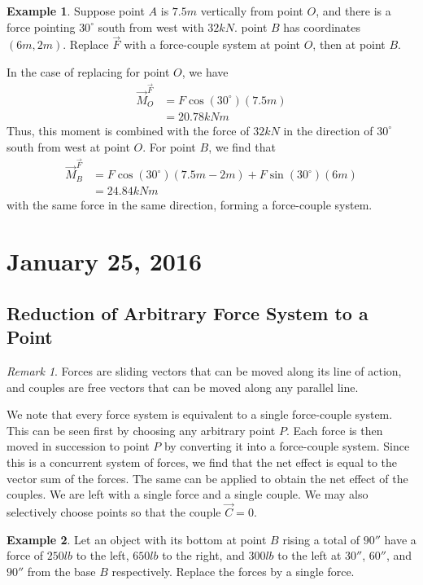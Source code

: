 \documentclass[11pt]{article}
\theoremstyle{plain} %
\theoremstyle{definition}
\theoremstyle{example}
\newtheorem*{example}{Example}
\theoremstyle{remark}
\newtheorem*{remark}{Remark}
\begin{document}
\begin{example}
Suppose point $A$ is $7.5m$ vertically from point $O$, and there is a force pointing $30^{\circ}$ south from west with $32kN$. point $B$ has coordinates $(6m, 2m)$. Replace $\vec{F}$ with a force-couple system at point $O$, then at point $B$. 
\end{example}
In the case of replacing for point $O$, we have 
\begin{align*}
\vec{M}_O^{\vec{F}} &= F\cos\left(30^{\circ}\right)(7.5m) \\
&= 20.78kNm
\end{align*}
Thus, this moment is combined with the force of $32kN$ in the direction of $30^{\circ}$ south from west at point $O$. For point $B$, we find that 
\begin{align*}
	\vec{M}_B^{\vec{F}} &= F\cos\left(30^{\circ}\right)(7.5m-2m) + F\sin\left(30^{\circ}\right)(6m)\\
	&= 24.84kNm
\end{align*}
with the same force in the same direction, forming a force-couple system. 

\section{January 25, 2016}
\subsection{Reduction of Arbitrary Force System to a Point}
\begin{remark}
Forces are sliding vectors that can be moved along its line of action, and couples are free vectors that can be moved along any parallel line. 
\end{remark}

We note that every force system is equivalent to a single force-couple system. This can be seen first by choosing any arbitrary point $P$. Each force is then moved in succession to point $P$ by converting it into a force-couple system. Since this is a concurrent system of forces, we find that the net effect is equal to the vector sum of the forces. The same can be applied to obtain the net effect of the couples. We are left with a single force and a single couple. We may also selectively choose points so that the couple $\vec{C} = 0$. 

\begin{example}
Let an object with its bottom at point $B$ rising a total of $90''$ have a force of $250lb$ to the left, $650lb$ to the right, and $300lb$ to the left at $30''$, $60''$, and $90''$ from the base $B$ respectively. Replace the forces by a single force.
\end{example}
\end{document}

